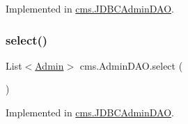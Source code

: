 Implemented in \mbox{\hyperlink{classcms_1_1_j_d_b_c_admin_d_a_o_a63cbff25e5bc997e5976e37d2b809270}{cms.\+J\+D\+B\+C\+Admin\+D\+AO}}.

\mbox{\label{interfacecms_1_1_admin_d_a_o_a3e45698575b289bb1772162a6f332d2e}} 
\subsubsection{\texorpdfstring{select()}{select()}}
{\footnotesize\ttfamily List$<$\mbox{\hyperlink{classcms_1_1_admin}{Admin}}$>$ cms.\+Admin\+D\+A\+O.\+select (\begin{DoxyParamCaption}{ }\end{DoxyParamCaption})}



Implemented in \mbox{\hyperlink{classcms_1_1_j_d_b_c_admin_d_a_o_a4cfb093895262f1b8a4ac7695cf50d74}{cms.\+J\+D\+B\+C\+Admin\+D\+AO}}.

